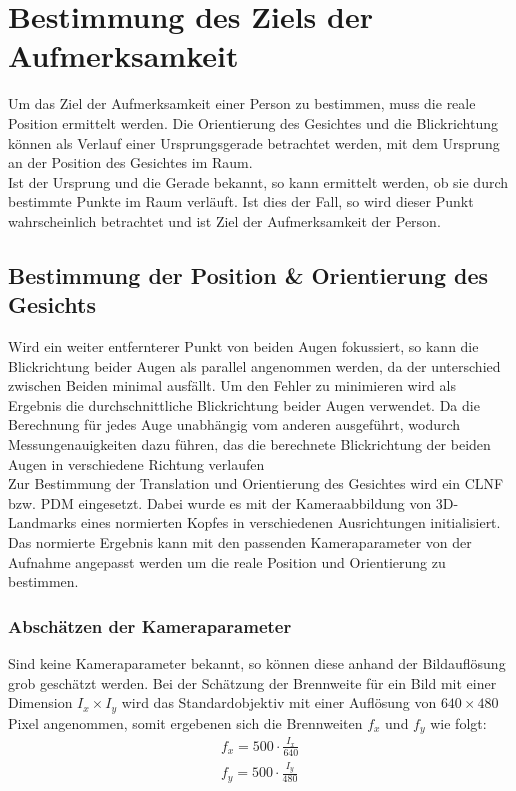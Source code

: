 \section{Bestimmung des Ziels der Aufmerksamkeit}
\label{calc_Position}
Um das Ziel der Aufmerksamkeit einer Person zu bestimmen, muss die reale Position ermittelt werden. Die Orientierung des Gesichtes und die Blickrichtung können als Verlauf einer Ursprungsgerade betrachtet werden, mit dem Ursprung an der Position des Gesichtes im Raum.\\
Ist der Ursprung und die Gerade bekannt, so kann ermittelt werden, ob sie durch bestimmte Punkte im Raum verläuft. Ist dies der Fall, so wird dieser Punkt wahrscheinlich betrachtet und ist Ziel der Aufmerksamkeit der Person.
\subsection{Bestimmung der Position \& Orientierung des Gesichts}
Wird ein weiter entfernterer Punkt von beiden Augen fokussiert, so kann die Blickrichtung beider Augen als parallel angenommen werden, da der unterschied zwischen Beiden minimal ausfällt. Um den Fehler zu minimieren wird als Ergebnis die durchschnittliche Blickrichtung beider Augen verwendet. Da die Berechnung für jedes Auge unabhängig vom anderen ausgeführt, wodurch Messungenauigkeiten dazu führen, das die berechnete Blickrichtung der beiden Augen in verschiedene Richtung verlaufen\\
Zur Bestimmung der Translation und Orientierung des Gesichtes wird ein CLNF bzw. PDM eingesetzt. Dabei wurde es mit der Kameraabbildung von 3D-Landmarks eines normierten Kopfes in verschiedenen Ausrichtungen initialisiert. Das normierte Ergebnis kann mit den passenden Kameraparameter von der Aufnahme angepasst werden um die reale Position und Orientierung zu bestimmen.
\subsubsection{Abschätzen der Kameraparameter}
Sind keine Kameraparameter bekannt, so können diese anhand der Bildauflösung grob geschätzt werden. Bei der Schätzung der Brennweite für ein Bild mit einer Dimension $I_x\times I_y$ wird das Standardobjektiv mit einer Auflösung von $640 \times 480$ Pixel angenommen, somit ergebenen sich die Brennweiten $f_x$ und $f_y$ wie folgt:
\begin{align*}
f_x = 500\cdot \frac{I_x}{640}\\
f_y = 500\cdot \frac{I_y}{480}
\end{align*}

